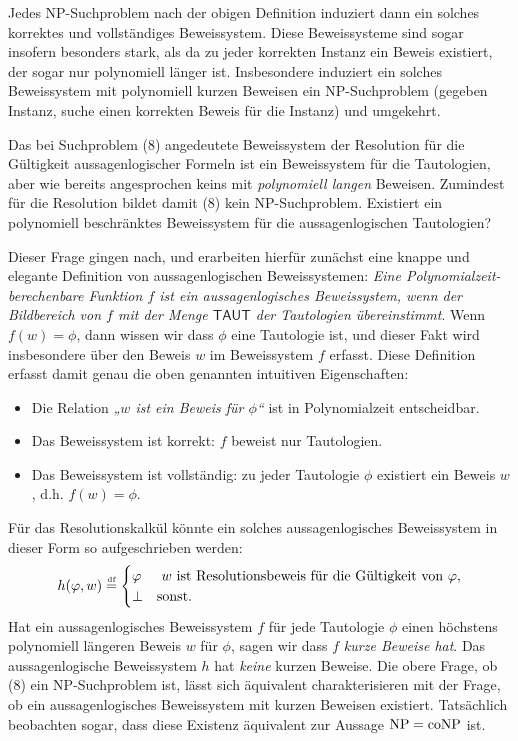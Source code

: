 Jedes NP-Suchproblem nach der obigen Definition induziert dann ein solches korrektes und vollständiges Beweissystem. Diese Beweissysteme sind sogar insofern besonders stark, als da zu jeder korrekten Instanz ein Beweis existiert, der sogar nur polynomiell länger ist.
Insbesondere induziert ein solches Beweissystem mit polynomiell kurzen Beweisen ein NP-Suchproblem (gegeben Instanz, suche einen korrekten Beweis für die Instanz) und umgekehrt.

Das bei Suchproblem (8) angedeutete Beweissystem der Resolution für die Gültigkeit aussagenlogischer Formeln ist ein Beweissystem für die Tautologien, aber wie bereits angesprochen keins mit \emph{polynomiell langen} Beweisen. Zumindest für die Resolution bildet damit (8) kein NP-Suchproblem. 
Existiert ein polynomiell beschränktes Beweissystem für die aussagenlogischen Tautologien?

Dieser Frage gingen \textcite{cook_relative_1979} nach, und erarbeiten hierfür zunächst eine knappe und elegante Definition von aussagenlogischen Beweissystemen: \emph{Eine Polynomialzeit-berechenbare Funktion $f$ ist ein \emph{aussagenlogisches Beweissystem}, wenn der Bildbereich von $f$ mit der Menge $\mathsf{TAUT}$ der Tautologien übereinstimmt}. Wenn $f(w)=\phi$, dann wissen wir dass $\phi$ eine Tautologie ist, und dieser Fakt wird insbesondere über den Beweis $w$ im Beweissystem $f$ erfasst. 
Diese Definition erfasst damit genau die oben genannten intuitiven Eigenschaften:
\begin{itemize}[noitemsep]
    \item Die Relation \emph{„$w$ ist ein Beweis für $\phi$“} ist in Polynomialzeit entscheidbar.
    \item Das Beweissystem ist korrekt: $f$ beweist nur Tautologien.
    \item Das Beweissystem ist vollständig: zu jeder Tautologie $\phi$ existiert ein Beweis $w$, d.h. $f(w)=\phi$.
\end{itemize}
Für das Resolutionskalkül könnte ein solches aussagenlogisches Beweissystem in dieser Form so aufgeschrieben werden:
\[ h(\varphi, w) \stackrel{\text{\smash{\tiny df}}}{=} \begin{cases} \varphi & \text{ $w$ ist Resolutionsbeweis für die Gültigkeit von $\varphi$},\\ \bot & \text{sonst}. \end{cases} \]
Hat ein aussagenlogisches Beweissystem $f$ für jede Tautologie $\phi$ einen höchstens polynomiell längeren Beweis $w$ für $\phi$, sagen wir dass $f$ \emph{kurze Beweise hat}. Das aussagenlogische Beweissystem $h$ hat \emph{keine} kurzen Beweise.
Die obere Frage, ob (8) ein NP-Suchproblem ist, lässt sich äquivalent charakterisieren mit der Frage, ob ein aussagenlogisches Beweissystem mit kurzen Beweisen existiert.
Tatsächlich beobachten \citeauthor{cook_relative_1979} sogar, dass diese Existenz äquivalent zur Aussage $\mathrm{NP}=\mathrm{coNP}$ ist.

